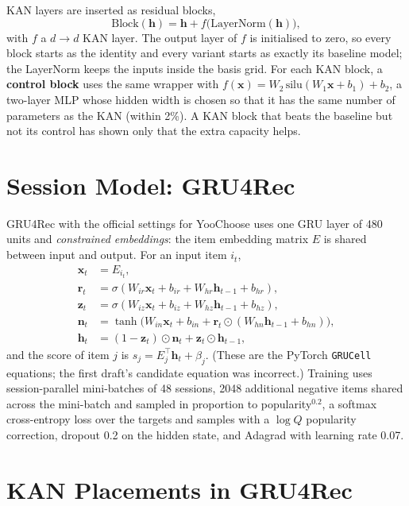 KAN layers are inserted as residual blocks,
\begin{equation}
\mathrm{Block}(\mathbf{h}) = \mathbf{h} + f\big(\mathrm{LayerNorm}(\mathbf{h})\big),
\label{eq:block}
\end{equation}
with $f$ a $d \to d$ KAN layer. The output layer of $f$ is initialised to zero,
so every block starts as the identity and every variant starts as exactly its
baseline model; the LayerNorm keeps the inputs inside the basis grid. For each KAN block, a \textbf{control block} uses the same
wrapper with $f(\mathbf{x}) = W_2\, \mathrm{silu}(W_1 \mathbf{x} + b_1) + b_2$, a
two-layer MLP whose hidden width is chosen so that it has the same number of
parameters as the KAN (within 2\%). A KAN block that beats the baseline but not
its control has shown only that the extra capacity helps.

\section{Session Model: GRU4Rec}

GRU4Rec \cite{hidasi2016,hidasi2018} with the official settings for YooChoose
uses one GRU layer of 480 units and \emph{constrained embeddings}: the item
embedding matrix $E$ is shared between input and output. For an input item $i_t$,
\begin{align}
\mathbf{x}_t &= E_{i_t}, \\
\mathbf{r}_t &= \sigma(W_{ir}\mathbf{x}_t + b_{ir} + W_{hr}\mathbf{h}_{t-1} + b_{hr}), \\
\mathbf{z}_t &= \sigma(W_{iz}\mathbf{x}_t + b_{iz} + W_{hz}\mathbf{h}_{t-1} + b_{hz}), \\
\mathbf{n}_t &= \tanh\big(W_{in}\mathbf{x}_t + b_{in} + \mathbf{r}_t \odot (W_{hn}\mathbf{h}_{t-1} + b_{hn})\big), \\
\mathbf{h}_t &= (1 - \mathbf{z}_t) \odot \mathbf{n}_t + \mathbf{z}_t \odot \mathbf{h}_{t-1},
\end{align}
and the score of item $j$ is $s_j = E_j^\top \mathbf{h}_t + \beta_j$.
(These are the PyTorch \texttt{GRUCell} equations; the first draft's candidate
equation was incorrect.) Training uses session-parallel mini-batches of 48
sessions, 2048 additional negative items shared across the mini-batch and
sampled in proportion to popularity$^{0.2}$, a softmax cross-entropy loss over
the targets and samples with a $\log Q$ popularity correction, dropout 0.2 on the
hidden state, and Adagrad with learning rate 0.07.

\section{KAN Placements in GRU4Rec}

